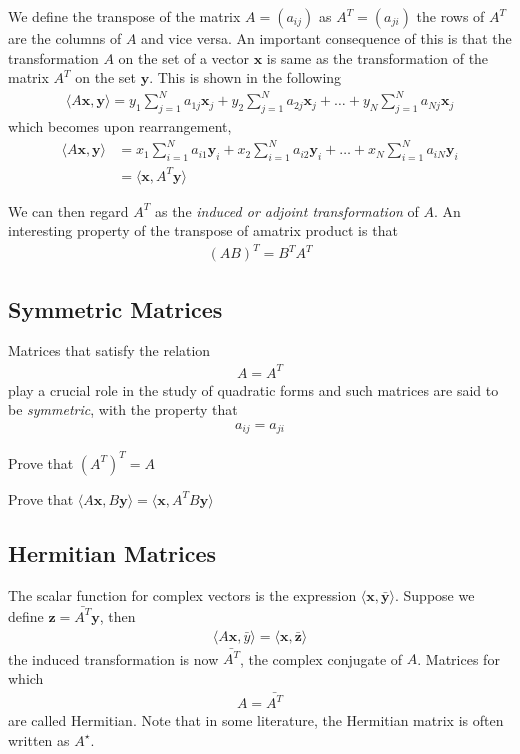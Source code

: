 We define the transpose of the matrix $A = (a_{ij})$ as $A^T = (a_{ji})$ \ie the rows of $A^T$ are the columns of $A$ and vice versa. An important consequence of this is that the transformation $A$ on the set of a vector $\bm{x}$ is same as the transformation of the matrix $A^T$ on the set $\bm{y}$. This is shown in the following
%
\begin{align}
	\langle A\bm{x}, \bm{y} \rangle  = y_1 \sum_{j=1}^{N} a_{1j} \bm{x}_j +  y_2 \sum_{j=1}^{N} a_{2j} \bm{x}_j +  \ldots +  y_N \sum_{j=1}^{N} a_{Nj} \bm{x}_j 
\end{align}
%
which becomes upon rearrangement,
%
\begin{align}
		\langle A\bm{x}, \bm{y} \rangle  & = x_1 \sum_{i=1}^{N} a_{i1} \bm{y}_i +  x_2 \sum_{i=1}^{N} a_{i2} \bm{y}_i +  \ldots +  x_N \sum_{i=1}^{N} a_{iN} \bm{y}_i  \\
		&= \langle \bm{x}, A^T \bm{y} \rangle 
\end{align}

We can then regard $A^T$ as the \textit{induced or adjoint transformation} of $A$. An interesting property of the transpose of amatrix product is that 
%
\begin{align}
	(AB)^T = B^T A^T
\end{align}

\subsection{Symmetric Matrices}
Matrices that satisfy the relation 
\begin{align}
	A = A^T
\end{align}
%
play a crucial role in the study of quadratic forms and such matrices are said to be \textit{symmetric}, with the property that 
%
\begin{align}
	a_{ij} = a_{ji}
\end{align}

\begin{homework}
	Prove that $(A^T)^T = A$
\end{homework}
%
\begin{homework}
	Prove that $\langle A\bm{x}, B\bm{y}\rangle = \langle \bm{x}, A^T B \bm{y} \rangle$
\end{homework}

\subsection{Hermitian Matrices}

The scalar function for complex vectors is the expression $\langle \bm{x}, \bm{\bar{y}}\rangle$. Suppose we define $\bm{z}=\bar{A^T} \bm{y}$, then 
%
\begin{align}
\langle A \bm{x}, \bar{y}\rangle =\langle \bm{x}, \bar{\bm{z}}\rangle 
\end{align}
%
\ie the induced transformation is now $\bar{A^T}$, the complex conjugate of $A$. Matrices for which 
%
\begin{align}
	A = \bar{A^T}
\end{align}
%
are called Hermitian. Note that in some literature, the Hermitian matrix is often written as $A^\star$.

